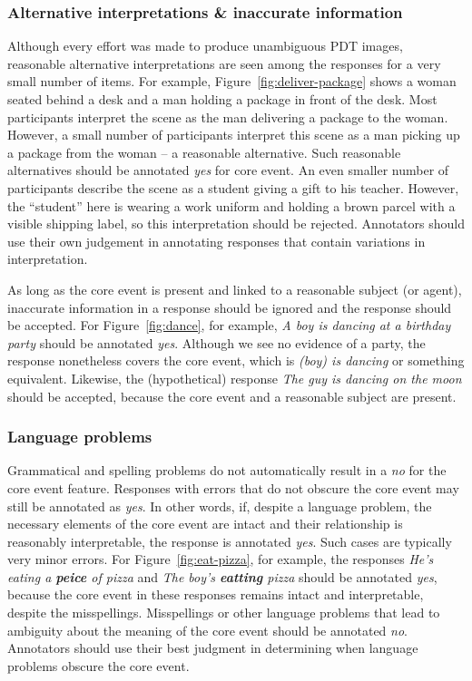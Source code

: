 \documentclass[12pt]{article}
\begin{document}
\subsubsection{Alternative interpretations \& inaccurate information} Although every effort was made to produce unambiguous PDT images, reasonable alternative interpretations are seen among the responses for a very small number of items. For example, Figure~\ref{fig:deliver-package} shows a woman seated behind a desk and a man holding a package in front of the desk. Most participants interpret the scene as the man delivering a package to the woman. However, a small number of participants interpret this scene as a man picking up a package from the woman -- a reasonable alternative. Such reasonable alternatives should be annotated \textit{yes} for core event. An even smaller number of participants describe the scene as a student giving a gift to his teacher. However, the ``student'' here is wearing a work uniform and holding a brown parcel with a visible shipping label, so this interpretation should be rejected. Annotators should use their own judgement in annotating responses that contain variations in interpretation.

As long as the core event is present and linked to a reasonable subject (or agent), inaccurate information in a response should be ignored and the response should be accepted. For Figure~\ref{fig:dance}, for example, \textit{A boy is dancing at a birthday party} should be annotated \textit{yes}. Although we see no evidence of a party, the response nonetheless covers the core event, which is \textit{(boy) is dancing} or something equivalent. Likewise, the (hypothetical) response \textit{The guy is dancing on the moon} should be accepted, because the core event and a reasonable subject are present.

\subsubsection{Language problems} Grammatical and spelling problems do not automatically result in a \textit{no} for the core event feature. Responses with errors that do not obscure the core event may still be annotated as \textit{yes}. In other words, if, despite a language problem, the necessary elements of the core event are intact and their relationship is reasonably interpretable, the response is annotated \textit{yes}. Such cases are typically very minor errors. For Figure~\ref{fig:eat-pizza}, for example, the responses \textit{He's eating a \textbf{peice} of pizza} and \textit{The boy's \textbf{eatting} pizza} should be annotated \textit{yes}, because the core event in these responses remains intact and interpretable, despite the misspellings. Misspellings or other language problems that lead to ambiguity about the meaning of the core event should be annotated \textit{no}. Annotators should use their best judgment in determining when language problems obscure the core event.
\end{document}
